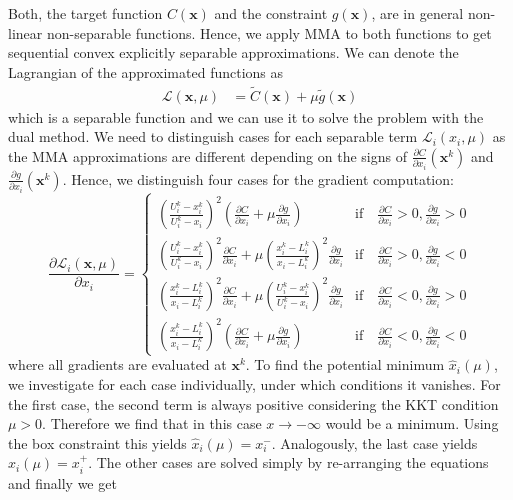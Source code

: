 Both, the target function $C(\mathbf{x})$ and the constraint $g(\mathbf{x})$, are in general non-linear non-separable functions. Hence, we apply MMA to both functions to get sequential convex explicitly separable approximations.
We can denote the Lagrangian of the approximated functions as 
\begin{align}
    \mathcal{L}(\mathbf{x}, \mu) &= \tilde{C}(\mathbf{x}) + \mu \tilde{g}(\mathbf{x})
    \label{eq:shape_lagrangian}
\end{align}
which is a separable function and we can use it to solve the problem with the dual method. We need to distinguish cases for each separable term $\mathcal{L}_i(x_i, \mu)$ as the MMA approximations are different depending on the signs of $\frac{\partial C}{\partial x_i} (\mathbf{x}^k)$ and $\frac{\partial g}{\partial x_i} (\mathbf{x}^k)$. Hence, we distinguish four cases for the gradient computation:
\begin{equation}
    \frac{\partial \mathcal{L}_i (\mathbf{x}, \mu)}{\partial x_i} = 
    \begin{cases}
        \left(\frac{U_i^k-x_i^k}{U_i^k-x_i}\right)^2 \left(\frac{\partial C}{\partial x_i} + \mu \frac{\partial g}{\partial x_i} \right) 
            &\textrm{if} \quad \frac{\partial C}{\partial x_i} > 0, \frac{\partial g}{\partial x_i} > 0 \\
        \left(\frac{U_i^k-x_i^k}{U_i^k-x_i}\right)^2 \frac{\partial C}{\partial x_i}  + \mu \left(\frac{x_i^k-L_i^k}{x_i-L_i^k}\right)^2 \frac{\partial g}{\partial x_i} 
            &\textrm{if} \quad \frac{\partial C}{\partial x_i}  > 0, \frac{\partial g}{\partial x_i} <0\\
        \left(\frac{x_i^k-L_i^k}{x_i-L_i^k}\right)^2 \frac{\partial C}{\partial x_i}  + \mu \left(\frac{U_i^k-x_i^k}{U_i^k-x_i}\right)^2\frac{\partial g}{\partial x_i} 
            &\textrm{if} \quad \frac{\partial C}{\partial x_i} < 0, \frac{\partial g}{\partial x_i}  > 0\\
        \left(\frac{x_i^k-L_i^k}{x_i-L_i^k}\right)^2 \left(\frac{\partial C}{\partial x_i}  + \mu \frac{\partial g}{\partial x_i} \right) 
            &\textrm{if} \quad \frac{\partial C}{\partial x_i}< 0, \frac{\partial g}{\partial x_i}< 0
    \end{cases}
\end{equation}
where all gradients are evaluated at $\mathbf{x}^k$.
To find the potential minimum $\hat{x}_i(\mu)$, we investigate for each case individually, under which conditions it vanishes. For the first case, the second term is always positive considering the KKT condition $\mu>0$. Therefore we find that in this case $x\rightarrow -\infty$ would be a minimum. Using the box constraint this yields $\hat{x}_i(\mu) = x^-_i$. Analogously, the last case yields $\hat{x}_i(\mu) = x^+_i$. The other cases are solved simply by re-arranging the equations and finally we get 
